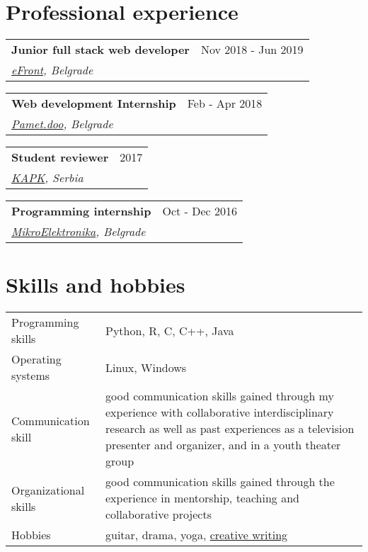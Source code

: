 \documentclass[a4paper,12pt]{article}
\begin{document}
\section{Professional experience}

\begin{tabularx}{\linewidth}{ @{}l r@{} }
\textbf{Junior full stack web developer} & \hfill Nov 2018 - Jun 2019 \\
\textit{\href{https://www.efront.com/}{eFront}, Belgrade} & \\[3.75pt]
\end{tabularx}

\begin{tabularx}{\linewidth}{ @{}l r@{} }
\textbf{Web development Internship} & \hfill Feb - Apr 2018 \\
\textit{\href{https://vicert.com/}{Pamet.doo}, Belgrade} & \\[3.75pt]
\end{tabularx}

\begin{tabularx}{\linewidth}{ @{}l r@{} }
\textbf{Student reviewer} & \hfill 2017 \\
\textit{\href{http://www.kapk.org/en/home/}{KAPK}, Serbia } & \\[3.75pt]
\end{tabularx}

\begin{tabularx}{\linewidth}{ @{}l r@{} }
\textbf{Programming internship} & \hfill Oct - Dec 2016 \\
\textit{\href{https://www.mikroe.com/}{MikroElektronika}, Belgrade } & \\[3.75pt]
\end{tabularx}


\section{Skills and hobbies}
\begin{tabularx}{\linewidth}{@{}l X@{}}
Programming skills &  \normalsize{Python, R, C, C++, Java}\\
Operating systems &  \normalsize{Linux, Windows}\\
Communication skill & \normalsize{good communication skills gained through my experience with collaborative interdisciplinary research as well as past experiences as a television presenter and organizer, and in a youth theater group} \\
Organizational skills  &  \normalsize{good communication skills gained through the experience in mentorship, teaching and collaborative projects}\\  
Hobbies &  \normalsize{guitar, drama, yoga, \href{http://blablablatruc.blogspot.com/}{creative writing}}\\
\end{tabularx}

\vfill
{}
\end{document}
